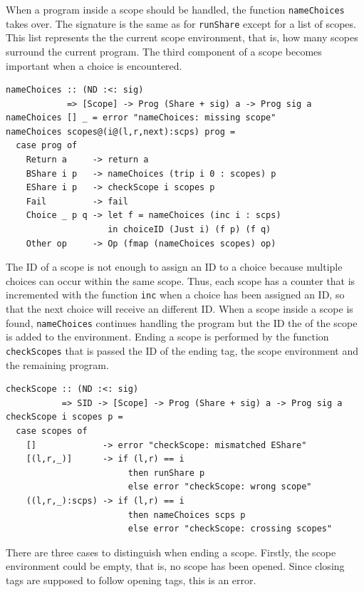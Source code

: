 \documentclass[a4paper, 11pt, fleqn, twoside]{scrreprt}
\newcommand{\hinl}[1]{\texttt{#1}}
\begin{document}
When a program inside a scope should be handled, the function \hinl{nameChoices} takes over.
The signature is the same as for \hinl{runShare} except for a list of scopes.
This list represents the the current scope environment, that is, how many scopes surround the current program.
The third component of a scope becomes important when a choice is encountered.

\begin{verbatim}
nameChoices :: (ND :<: sig)
            => [Scope] -> Prog (Share + sig) a -> Prog sig a
nameChoices [] _ = error "nameChoices: missing scope"
nameChoices scopes@(i@(l,r,next):scps) prog =
  case prog of
    Return a     -> return a
    BShare i p   -> nameChoices (trip i 0 : scopes) p
    EShare i p   -> checkScope i scopes p
    Fail         -> fail
    Choice _ p q -> let f = nameChoices (inc i : scps)
                    in choiceID (Just i) (f p) (f q)
    Other op     -> Op (fmap (nameChoices scopes) op)
\end{verbatim}

The ID of a scope is not enough to assign an ID to a choice because multiple choices can occur within the same scope.
Thus, each scope has a counter that is incremented with the function \hinl{inc} when a choice has been assigned an ID, so that the next choice will receive an different ID.
When a scope inside a scope is found, \hinl{nameChoices} continues handling the program but the ID the of the scope is added to the environment.
Ending a scope is performed by the function \hinl{checkScopes} that is passed the ID of the ending tag, the scope environment and the remaining program.

\begin{verbatim}
checkScope :: (ND :<: sig)
           => SID -> [Scope] -> Prog (Share + sig) a -> Prog sig a
checkScope i scopes p =
  case scopes of
    []             -> error "checkScope: mismatched EShare"
    [(l,r,_)]      -> if (l,r) == i
                        then runShare p
                        else error "checkScope: wrong scope"
    ((l,r,_):scps) -> if (l,r) == i
                        then nameChoices scps p
                        else error "checkScope: crossing scopes"
\end{verbatim}

There are three cases to distinguish when ending a scope.
Firstly, the scope environment could be empty, that is, no scope has been opened.
Since closing tags are supposed to follow opening tags, this is an error.
\end{document}
